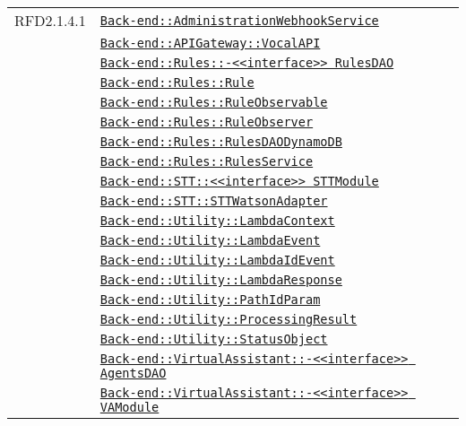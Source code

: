 \begin{longtable}{|>{\centering}m{3cm}|m{10cm}<{\centering}|}
RFD2.1.4.1 & \hyperref[Back-end::AdministrationWebhookService]{\texttt{Back-end::AdministrationWebhookService}}\\
& \hyperref[Back-end::APIGateway::VocalAPI]{\texttt{Back-end::APIGateway::VocalAPI}}\\
& \hyperref[Back-end::Rules::<<interface>> RulesDAO]{\texttt{Back-end::Rules::-\linebreak <<interface>> RulesDAO}}\\
& \hyperref[Back-end::Rules::Rule]{\texttt{Back-end::Rules::Rule}}\\
& \hyperref[Back-end::Rules::RuleObservable]{\texttt{Back-end::Rules::RuleObservable}}\\
& \hyperref[Back-end::Rules::RuleObserver]{\texttt{Back-end::Rules::RuleObserver}}\\
& \hyperref[Back-end::Rules::RulesDAODynamoDB]{\texttt{Back-end::Rules::RulesDAODynamoDB}}\\
& \hyperref[Back-end::Rules::RulesService]{\texttt{Back-end::Rules::RulesService}}\\
& \hyperref[Back-end::STT::<<interface>> STTModule]{\texttt{Back-end::STT::<<interface>> STTModule}}\\
& \hyperref[Back-end::STT::STTWatsonAdapter]{\texttt{Back-end::STT::STTWatsonAdapter}}\\
& \hyperref[Back-end::Utility::LambdaContext]{\texttt{Back-end::Utility::LambdaContext}}\\
& \hyperref[Back-end::Utility::LambdaEvent]{\texttt{Back-end::Utility::LambdaEvent}}\\
& \hyperref[Back-end::Utility::LambdaIdEvent]{\texttt{Back-end::Utility::LambdaIdEvent}}\\
& \hyperref[Back-end::Utility::LambdaResponse]{\texttt{Back-end::Utility::LambdaResponse}}\\
& \hyperref[Back-end::Utility::PathIdParam]{\texttt{Back-end::Utility::PathIdParam}}\\
& \hyperref[Back-end::Utility::ProcessingResult]{\texttt{Back-end::Utility::ProcessingResult}}\\
& \hyperref[Back-end::Utility::StatusObject]{\texttt{Back-end::Utility::StatusObject}}\\
& \hyperref[Back-end::VirtualAssistant::<<interface>> AgentsDAO]{\texttt{Back-end::VirtualAssistant::-\linebreak <<interface>> AgentsDAO}}\\
& \hyperref[Back-end::VirtualAssistant::<<interface>> VAModule]{\texttt{Back-end::VirtualAssistant::-\linebreak <<interface>> VAModule}}\\

\end{longtable}
